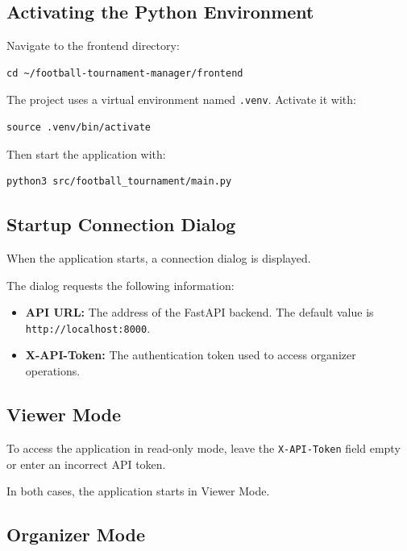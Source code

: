 \documentclass[12pt,a4paper]{article}
\begin{document}
\subsection{Activating the Python Environment}

Navigate to the frontend directory:

\begin{lstlisting}
cd ~/football-tournament-manager/frontend
\end{lstlisting}

The project uses a virtual environment named
\texttt{.venv}. Activate it with:

\begin{lstlisting}
source .venv/bin/activate
\end{lstlisting}

Then start the application with:

\begin{lstlisting}
python3 src/football_tournament/main.py
\end{lstlisting}

\subsection{Startup Connection Dialog}

When the application starts, a connection dialog is displayed.

The dialog requests the following information:

\begin{itemize}
\item \textbf{API URL:} The address of the FastAPI backend.
The default value is
\texttt{http://localhost:8000}.

\item \textbf{X-API-Token:} The authentication token used
to access organizer operations.
\end{itemize}

\subsection{Viewer Mode}

To access the application in read-only mode, leave the
\texttt{X-API-Token} field empty or enter an incorrect API token.

In both cases, the application starts in Viewer Mode.

\subsection{Organizer Mode}
\end{document}
